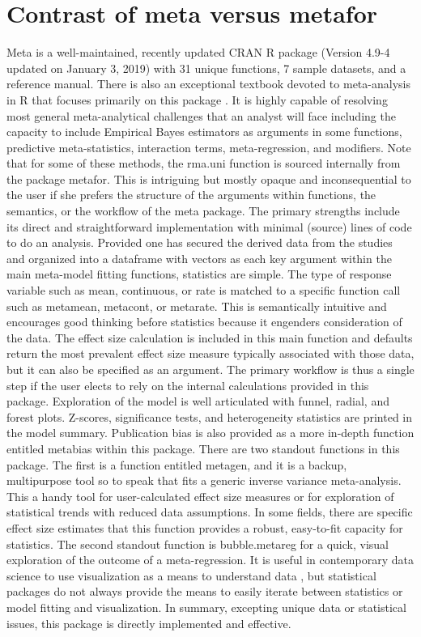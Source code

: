 \section{Contrast of meta versus metafor}
Meta is a well-maintained, recently updated CRAN R package (Version 4.9-4 updated on January 3, 2019) with 31 unique functions, 7 sample datasets, and a reference manual.  There is also an exceptional textbook devoted to meta-analysis in R that focuses primarily on this package \citep{RN6199}.  It is highly capable of resolving most general meta-analytical challenges that an analyst will face including the capacity to include Empirical Bayes estimators as arguments in some functions, predictive meta-statistics, interaction terms, meta-regression, and modifiers.  Note that for some of these methods, the rma.uni function is sourced internally from the package metafor.  This is intriguing but mostly opaque and inconsequential to the user if she prefers the structure of the arguments within functions, the semantics, or the workflow of the meta package.  The primary strengths include its direct and straightforward implementation with minimal (source) lines of code to do an analysis.  Provided one has secured the derived data from the studies and organized into a dataframe with vectors as each key argument within the main meta-model fitting functions, statistics are simple.  The type of response variable such as mean, continuous, or rate is matched to a specific function call such as metamean, metacont, or metarate.  This is semantically intuitive and encourages good thinking before statistics because it engenders consideration of the data.  The effect size calculation is included in this main function and defaults return the most prevalent effect size measure typically associated with those data, but it can also be specified as an argument.  The primary workflow is thus a single step if the user elects to rely on the internal calculations provided in this package.  Exploration of the model is well articulated with funnel, radial, and forest plots.  Z-scores, significance tests, and heterogeneity statistics are printed in the model summary. Publication bias is also provided as a more in-depth function entitled metabias within this package.  There are two standout functions in this package.  The first is a function entitled metagen, and it is a backup, multipurpose tool so to speak that fits a generic inverse variance meta-analysis.  This a handy tool for user-calculated effect size measures or for exploration of statistical trends with reduced data assumptions.  In some fields, there are specific effect size estimates that this function provides a robust, easy-to-fit capacity for statistics.  The second standout function is bubble.metareg for a quick, visual exploration of the outcome of a meta-regression.  It is useful in contemporary data science to use visualization as a means to understand data \citep{RN4510}, but statistical packages do not always provide the means to easily iterate between statistics or model fitting and visualization.  In summary, excepting unique data or statistical issues, this package is directly implemented and effective.

